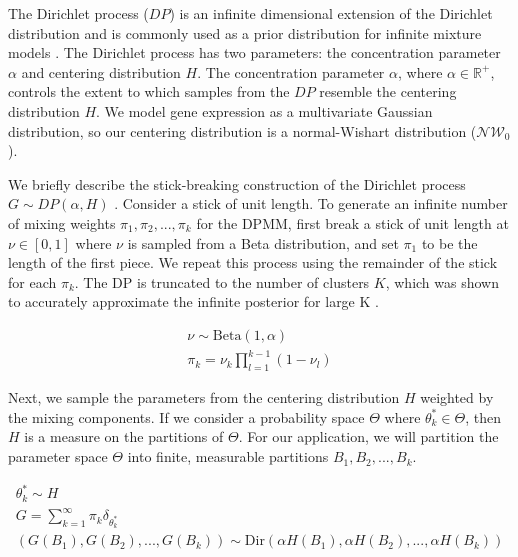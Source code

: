 \documentclass[10pt,letterpaper]{article}
\begin{document}
The Dirichlet process ($DP$) is an infinite dimensional extension of the Dirichlet distribution \cite{fergusonBayesianAnalysisNonparametric1973} and is commonly used as a prior distribution for infinite mixture models \cite{muller2004nonparametric, gorurDirichletProcessGaussian2010}. The Dirichlet process has two parameters: the concentration parameter $\alpha$ and centering distribution $H$. The concentration parameter $\alpha$, where $\alpha \in \mathbb{R}^+$, controls the extent to which samples from the $DP$ resemble the centering distribution $H$. We model gene expression as a multivariate Gaussian distribution, so our centering distribution is a normal-Wishart distribution ($\mathcal{NW}_0$).

We briefly describe the stick-breaking construction of the Dirichlet process $G \sim DP(\alpha, H)$ \cite{hughes2013memoized, teh2010dirichlet, gelmanBayesianDataAnalysis2013, fergusonBayesianAnalysisNonparametric1973}. Consider a stick of unit length. To generate an infinite number of mixing weights $\pi_1, \pi_2, ..., \pi_k$ for the DPMM, first break a stick of unit length at $\nu \in [0, 1]$ where $\nu$ is sampled from a Beta distribution, and set $\pi_1$ to be the length of the first piece. We repeat this process using the remainder of the stick for each $\pi_k$. The DP is truncated to the number of clusters $K$, which was shown to accurately approximate the infinite posterior for large K \cite{hughes2013memoized}.


\begin{gather}
\label{eq:dp}
\nu \sim \text{Beta}(1, \alpha) \\
\pi_k = \nu_k \prod_{l=1}^{k-1}(1 - \nu_l)
\end{gather}

Next, we sample the parameters from the centering distribution $H$ weighted by the mixing components. If we consider a probability space $\Theta$ where $\theta_k^{*} \in \Theta$, then $H$ is a measure on the partitions of $\Theta$. For our application, we will partition the parameter space $\Theta$ into finite, measurable partitions $B_1, B_2, ..., B_k$. 

\begin{gather}
\theta_k^{*} \sim H \\
G = \sum_{k=1}^{\infty} \pi_k \delta_{\theta_k^{*}} \\
(G(B_1), G(B_2), ..., G(B_k)) \sim \text{Dir}(\alpha H(B_1), \alpha H(B_2), ..., \alpha H(B_k)) 
\end{gather}
\end{document}
